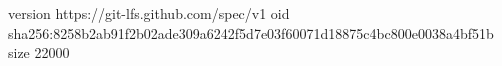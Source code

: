 version https://git-lfs.github.com/spec/v1
oid sha256:8258b2ab91f2b02ade309a6242f5d7e03f60071d18875c4bc800e0038a4bf51b
size 22000
